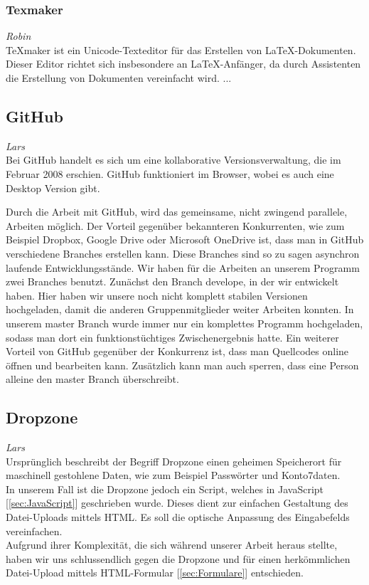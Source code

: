 \documentclass[12pt,a4paper,bibliography=totocnumbered,listof=totocnumbered]{scrartcl}
\begin{document}
\subsubsection{Texmaker}
\label{sec:Texmaker}
\emph{Robin}\\
TeXmaker ist ein Unicode-Texteditor für das Erstellen von LaTeX-Dokumenten. Dieser Editor richtet sich insbesondere an LaTeX-Anfänger, da durch Assistenten die Erstellung von Dokumenten vereinfacht wird. \cite{Texmaker}
...

\pagebreak
\subsection{GitHub}
\label{sec:GitHub}
\emph{Lars}\\
Bei GitHub handelt es sich um eine kollaborative Versionsverwaltung, die im Februar 2008 erschien. GitHub funktioniert im Browser, wobei es auch eine Desktop Version gibt.\cite{wiki/GitHub}

Durch die Arbeit mit GitHub, wird das gemeinsame, nicht zwingend parallele, Arbeiten möglich. Der Vorteil gegenüber bekannteren Konkurrenten, wie zum Beispiel Dropbox, Google Drive oder Microsoft OneDrive ist, dass man in GitHub verschiedene Branches erstellen kann. Diese Branches sind so zu sagen asynchron laufende Entwicklungsstände. Wir haben für die Arbeiten an unserem Programm zwei Branches benutzt. Zunächst den Branch \glqq develope\grqq , in der wir entwickelt haben. Hier haben wir unsere noch nicht komplett stabilen Versionen hochgeladen, damit die anderen Gruppenmitglieder weiter Arbeiten konnten. In unserem \glqq master\grqq{} Branch wurde immer nur ein komplettes Programm hochgeladen, sodass man dort ein funktionstüchtiges Zwischenergebnis hatte. Ein weiterer Vorteil von GitHub gegenüber der Konkurrenz ist, dass man Quellcodes online öffnen und bearbeiten kann. Zusätzlich kann man auch sperren, dass eine Person alleine den \glqq master\grqq{} Branch überschreibt.

\subsection{Dropzone}
\label{sec:Dropzone}
\emph{Lars}\\
Ursprünglich beschreibt der Begriff \glqq Dropzone\grqq{} einen geheimen Speicherort für maschinell gestohlene Daten, wie zum Beispiel Passwörter und Konto7daten.\cite{wiki/Dropzone} \\
In unserem Fall ist die Dropzone jedoch ein Script, welches in JavaScript [\ref{sec:JavaScript}] geschrieben wurde. Dieses dient zur einfachen Gestaltung des Datei-Uploads mittels HTML. Es soll die optische Anpassung des Eingabefelds vereinfachen. \\
Aufgrund ihrer Komplexität, die sich während unserer Arbeit heraus stellte, haben wir uns schlussendlich gegen die Dropzone und für einen herkömmlichen Datei-Upload mittels HTML-Formular [\ref{sec:Formulare}] entschieden.
\end{document}
